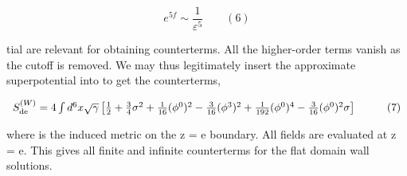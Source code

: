 \documentclass{article}
\begin{document}
\begin{equation}
e ^ { 5 f } \sim \frac { 1 } { \varepsilon ^ { 5 } } \qquad ( 6 )
\end{equation}


tial are relevant for obtaining counterterms. All the higher-order terms vanish as the cutoff
is removed. We may thus legitimately insert the approximate superpotential into to get the
counterterms,


\begin{equation}
\begin{array} { c c } { S _ { \mathrm { d e } } ^ { ( W ) } = 4 \int d ^ { 6 } x \sqrt { \gamma } \left [ \frac { 1 } { 2 } + \frac { 3 } { 4 } \sigma ^ { 2 } + \frac { 1 } { 1 6 } ( \phi ^ { 0 } ) ^ { 2 } - \frac { 3 } { 1 6 } ( \phi ^ { 3 } ) ^ { 2 } + \frac { 1 } { 1 9 2 } ( \phi ^ { 0 } ) ^ { 4 } - \frac { 3 } { 1 6 } ( \phi ^ { 0 } ) ^ { 2 } \sigma \right ] \qquad } & { ( 7 ) } \\\end{array}
\end{equation}


where  is the induced metric on the z = e boundary. All fields are evaluated at z = e. This
gives all finite and infinite counterterms for the flat domain wall solutions.
\end{document}
